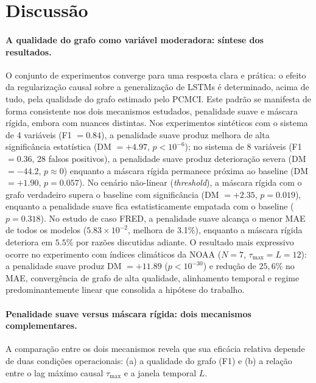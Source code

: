 \documentclass[12pt, a4paper]{article}
\begin{document}
\section{Discussão}

\paragraph{A qualidade do grafo como variável moderadora: síntese dos resultados.}
O conjunto de experimentos converge para uma resposta clara e prática: o efeito da regularização causal sobre a generalização de LSTMs é determinado, acima de tudo, pela qualidade do grafo estimado pelo PCMCI. Este padrão se manifesta de forma consistente nos dois mecanismos estudados, penalidade suave e máscara rígida, embora com nuances distintas. Nos experimentos sintéticos com o sistema de 4 variáveis (F1 $= 0.84$), a penalidade suave produz melhora de alta significância estatística (DM $= +4.97$, $p < 10^{-6}$); no sistema de 8 variáveis (F1 $= 0.36$, 28 falsos positivos), a penalidade suave produz deterioração severa (DM $= -44.2$, $p \approx 0$) enquanto a máscara rígida permanece próxima ao baseline (DM $= +1.90$, $p = 0.057$). No cenário não-linear (\emph{threshold}), a máscara rígida com o grafo verdadeiro supera o baseline com significância (DM $= +2.35$, $p = 0.019$), enquanto a penalidade suave fica estatisticamente empatada com o baseline ($p = 0.318$). No estudo de caso FRED, a penalidade suave alcança o menor MAE de todos os modelos ($5.83 \times 10^{-2}$, melhora de 3.1\%), enquanto a máscara rígida deteriora em $5.5\%$ por razões discutidas adiante. O resultado mais expressivo ocorre no experimento com índices climáticos da NOAA ($N=7$, $\tau_{\max} = L = 12$): a penalidade suave produz DM $= +11.89$ ($p < 10^{-30}$) e redução de $25{,}6\%$ no MAE, convergência de grafo de alta qualidade, alinhamento temporal e regime predominantemente linear que consolida a hipótese do trabalho.

\paragraph{Penalidade suave versus máscara rígida: dois mecanismos complementares.}
A comparação entre os dois mecanismos revela que sua eficácia relativa depende de duas condições operacionais: (a) a qualidade do grafo (F1) e (b) a relação entre o lag máximo causal $\tau_{\max}$ e a janela temporal $L$.
\end{document}
